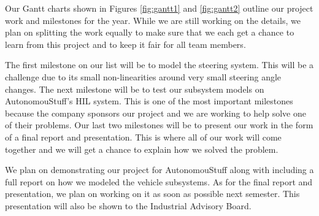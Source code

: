 \documentclass[letterpaper,12pt]{article}   %
\begin{document}
	Our Gantt charts shown in Figures \ref{fig:gantt1} and \ref{fig:gantt2} outline our project work and milestones for the year. While we are still working on the details, we plan on splitting the work equally to make sure that we each get a chance to learn from this project and to keep it fair for all team members.  


The first milestone on our list will be to model the steering system. This will be a challenge due to its small non-linearities around very small steering angle changes. The next milestone will be to test our subsystem models on AutonomouStuff's HIL system. This is one of the most important milestones because the company sponsors our project and we are working to help solve one of their problems. Our last two milestones will be to present our work in the form of a final report and presentation. This is where all of our work will come together and we will get a chance to explain how we solved the problem. 

We plan on demonstrating our project for AutonomouStuff along with including a full report on how we modeled the vehicle subsystems. As for the final report and presentation, we plan on working on it as soon as possible next semester. This presentation will also be shown to the Industrial Advisory Board. 




\end{document}
